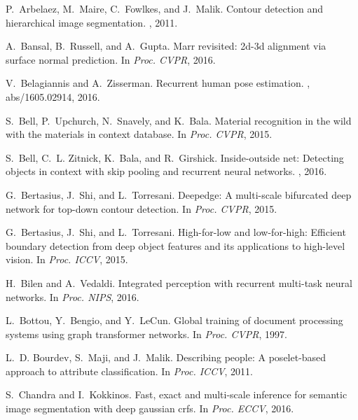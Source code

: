 \documentclass[10pt,twocolumn,letterpaper]{article}
\begin{document}
\newcommand{\noopsort}[1]{} \newcommand{\printfirst}[2]{#1}
\newcommand{\singleletter}[1]{#1} \newcommand{\switchargs}[2]{#2#1}
\begin{thebibliography}{100}\itemsep=-1pt
	
	P.~Arbelaez, M.~Maire, C.~Fowlkes, and J.~Malik.
	\newblock Contour detection and hierarchical image segmentation.
	, 2011.
	
	A.~Bansal, B.~Russell, and A.~Gupta.
	\newblock Marr revisited: 2d-3d alignment via surface normal prediction.
	\newblock In {\em Proc. {CVPR}}, 2016.
	
	V.~Belagiannis and A.~Zisserman.
	\newblock Recurrent human pose estimation.
	, abs/1605.02914, 2016.
	
	S.~Bell, P.~Upchurch, N.~Snavely, and K.~Bala.
	\newblock Material recognition in the wild with the materials in context
	database.
	\newblock In {\em Proc. {CVPR}}, 2015.
	
	S.~Bell, C.~L. Zitnick, K.~Bala, and R.~Girshick.
	\newblock Inside-outside net: Detecting objects in context with skip pooling
	and recurrent neural networks.
	, 2016.
	
	G.~Bertasius, J.~Shi, and L.~Torresani.
	\newblock Deepedge: {A} multi-scale bifurcated deep network for top-down
	contour detection.
	\newblock In {\em Proc. {CVPR}}, 2015.
	
	G.~Bertasius, J.~Shi, and L.~Torresani.
	\newblock High-for-low and low-for-high: Efficient boundary detection from deep
	object features and its applications to high-level vision.
	\newblock In {\em Proc. {ICCV}}, 2015.
	
	H.~Bilen and A.~Vedaldi.
	\newblock Integrated perception with recurrent multi-task neural networks.
	\newblock In {\em Proc. {NIPS}}, 2016.
	
	L.~Bottou, Y.~Bengio, and Y.~LeCun.
	\newblock Global training of document processing systems using graph
	transformer networks.
	\newblock In {\em Proc. {CVPR}}, 1997.
	
	L.~D. Bourdev, S.~Maji, and J.~Malik.
	\newblock Describing people: {A} poselet-based approach to attribute
	classification.
	\newblock In {\em Proc. {ICCV}}, 2011.
	
	S.~Chandra and I.~Kokkinos.
	\newblock Fast, exact and multi-scale inference for semantic image segmentation
	with deep gaussian crfs.
	\newblock In {\em Proc. {ECCV}}, 2016.
	

\end{thebibliography}
\end{document}
